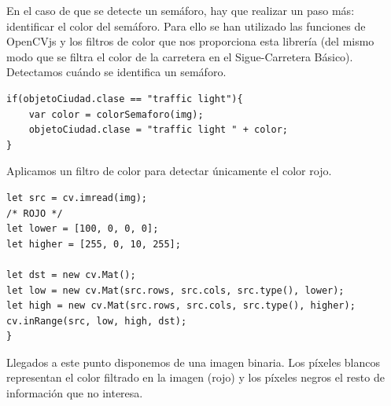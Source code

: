 \documentclass{report}
\begin{document}
En el caso de que se detecte un semáforo, hay que realizar un paso más: identificar el color del semáforo. Para ello se han utilizado las funciones de OpenCVjs y los filtros de color que nos proporciona esta librería (del mismo modo que se filtra el color de la carretera en el Sigue-Carretera Básico).
\\

Detectamos cuándo se identifica un semáforo.

\begin{lstlisting}[backgroundcolor = \color{light-gray},
				   aboveskip = 2em,
				   belowskip = 2em,
                   xleftmargin = 2cm,
                   framexleftmargin = 1em,
                   basicstyle=\small]
if(objetoCiudad.clase == "traffic light"){
	var color = colorSemaforo(img);
	objetoCiudad.clase = "traffic light " + color;
}\end{lstlisting}

Aplicamos un filtro de color para detectar únicamente el color rojo.

\begin{lstlisting}[backgroundcolor = \color{light-gray},
				   aboveskip = 1em,
				   belowskip = 2em,
                   xleftmargin = 2cm,
                   framexleftmargin = 1em,
                   basicstyle=\small]
let src = cv.imread(img);
/* ROJO */
let lower = [100, 0, 0, 0];
let higher = [255, 0, 10, 255];

let dst = new cv.Mat();
let low = new cv.Mat(src.rows, src.cols, src.type(), lower);
let high = new cv.Mat(src.rows, src.cols, src.type(), higher);
cv.inRange(src, low, high, dst);
}\end{lstlisting}

Llegados a este punto disponemos de una imagen binaria. Los píxeles blancos representan el color filtrado en la imagen (rojo) y los píxeles negros el resto de información que no interesa.
\end{document}

